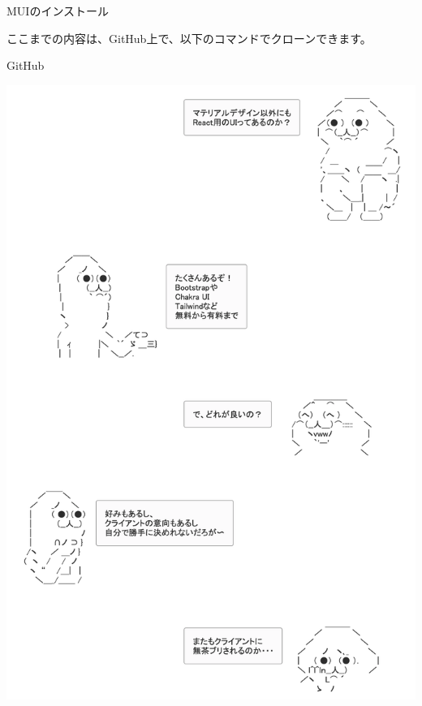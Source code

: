 \def\startercodeblockfontsize{}
\begin{starterterminal}[]{MUIのインストール}\end{starterterminal}
\begin{starternote}[]{}

ここまでの内容は、GitHub上で、以下のコマンドでクローンできます。

\def\startercodeblockfontsize{}
\begin{starterterminal}[]{GitHub}\end{starterterminal}
\end{starternote}
\begin{reviewimage}[H]%
\includegraphics[width=0.8\maxwidth]{./images/03-todo-with-react/yaruo-ui01.png}%
\label{image:03-todo-with-react:yaruo-ui01}
\end{reviewimage}

